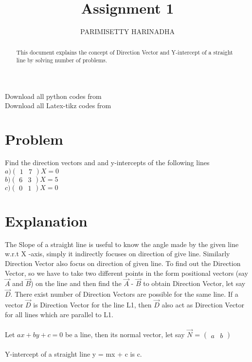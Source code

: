 \documentclass[journal,12pt,twocolumn]{IEEEtran}
\title{Assignment 1}
\author{PARIMISETTY HARINADHA }
\begin{document}
\maketitle
\newpage
\begin{abstract}
This document explains the concept of Direction Vector and Y-intercept of a straight line by solving number of problems.
\end{abstract}
Download all python codes from 
 \\
\newline
Download all Latex-tikz codes from 
 \par

\section{Problem}
Find the direction vectors and and y-intercepts of the following lines \\
\newline
$
a) \begin{pmatrix} 
	1 & 7 
\end{pmatrix} X = 0
$
\\
$
b) \begin{pmatrix} 6 & 3
\end{pmatrix} X = 5
$
\\
$
c) \begin{pmatrix} 0 & 1 
\end{pmatrix} X = 0
$
\section{Explanation}
The Slope of a straight line is useful to know the angle made by the given line w.r.t X -axis, simply it indirectly focuses on direction of give line. Similarly Direction Vector also focus on direction of given line. To find out the Direction Vector, so we have to take two different points in the form positional vectors (say $\vec{A}$ and $\vec{B}$) on the line and then find the $\vec{A}$ - $\vec{B}$ to obtain Direction Vector, let say $\vec{D}$. There exist number of Direction Vectors are possible for the same line. If a vector $\vec{D}$ is Direction Vector for the line L1, then $\vec{D}$ also act as Direction Vector for all lines which are parallel to L1.
\\
\\
Let $ ax+by+c=0 $ be a line, then its normal vector, let say $\vec{N}$ = $ \begin{pmatrix} 
	a & b 
\end{pmatrix}
$
\\
\\
Y-intercept of a straight line y = mx + c is c.
\\
\\
\end{document}
